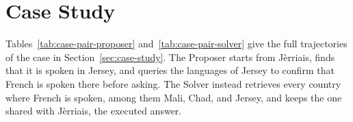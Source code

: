\section{Case Study}
\label{app:case-study}
Tables~\ref{tab:case-pair-proposer} and~\ref{tab:case-pair-solver} give the full trajectories of the case in Section~\ref{sec:case-study}. The Proposer starts from Jèrriais, finds that it is spoken in Jersey, and queries the languages of Jersey to confirm that French is spoken there before asking. The Solver instead retrieves every country where French is spoken, among them Mali, Chad, and Jersey, and keeps the one shared with Jèrriais, the executed answer.

